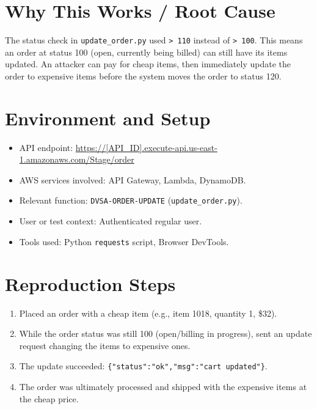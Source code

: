 \documentclass[12pt]{report}
\begin{document}
\section{Why This Works / Root Cause}
The status check in \texttt{update\_order.py} used \texttt{> 110} instead of \texttt{> 100}. This means an order at status 100 (open, currently being billed) can still have its items updated. An attacker can pay for cheap items, then immediately update the order to expensive items before the system moves the order to status 120.

\section{Environment and Setup}
\begin{itemize}
  \item API endpoint: \url{https://[API_ID].execute-api.us-east-1.amazonaws.com/Stage/order}
  \item AWS services involved: API Gateway, Lambda, DynamoDB.
  \item Relevant function: \texttt{DVSA-ORDER-UPDATE} (\texttt{update\_order.py}).
  \item User or test context: Authenticated regular user.
  \item Tools used: Python \texttt{requests} script, Browser DevTools.
\end{itemize}

\section{Reproduction Steps}
\begin{enumerate}
  \item Placed an order with a cheap item (e.g., item 1018, quantity 1, \$32).
  \item While the order status was still 100 (open/billing in progress), sent an update request changing the items to expensive ones.
  \item The update succeeded: \texttt{\{"status":"ok","msg":"cart updated"\}}.
  \item The order was ultimately processed and shipped with the expensive items at the cheap price.
\end{enumerate}
\end{document}
